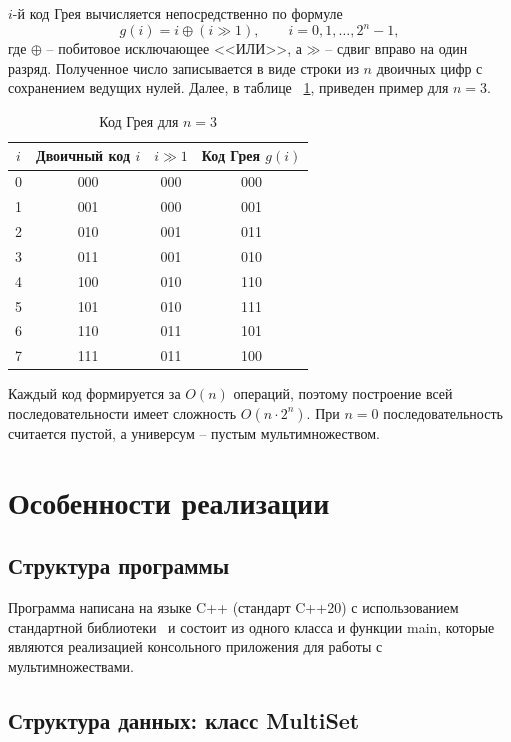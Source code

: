\documentclass[14pt,a4paper]{extreport}
\newcommand{\xor}{\mathbin{\oplus}}
\newcommand{\shr}{\mathbin{\gg}}
\begin{document}
$i$-й код Грея вычисляется непосредственно по формуле
\begin{equation}
g(i)=i\xor(i\shr 1),\qquad i=0,1,\ldots,2^n-1,
\end{equation}
где $\xor$ -- побитовое исключающее <<ИЛИ>>, а $\shr$ -- сдвиг вправо на один разряд. Полученное число записывается в виде строки из $n$ двоичных цифр с сохранением ведущих нулей. Далее, в таблице ~\ref{tab:gray}, приведен пример для $n=3$. 

\begin{table}[H]
\caption{Код Грея для $n=3$}\label{tab:gray}
\centering\small\singlespacing
\begin{tabular}{|c|c|c|c|}
\toprule
$i$ & Двоичный код $i$ & $i\shr 1$ & Код Грея $g(i)$ \\
\midrule
0 & 000 & 000 & 000 \\ \hline
1 & 001 & 000 & 001 \\ \hline
2 & 010 & 001 & 011 \\ \hline
3 & 011 & 001 & 010 \\ \hline
4 & 100 & 010 & 110 \\ \hline
5 & 101 & 010 & 111 \\ \hline
6 & 110 & 011 & 101 \\ \hline
7 & 111 & 011 & 100 \\
\bottomrule
\end{tabular}
\end{table}

Каждый код формируется за $O(n)$ операций, поэтому построение всей последовательности имеет сложность $O(n\cdot 2^n)$. При $n=0$ последовательность считается пустой, а универсум -- пустым мультимножеством.

{\centering\section{Особенности реализации}}

\subsection{Структура программы}

Программа написана на языке C++ (стандарт C++20) с использованием стандартной библиотеки~\cite{cppref} и состоит из одного класса и функции main, которые являются реализацией консольного приложения для работы с мультимножествами.

\subsection{Структура данных: класс MultiSet}
\end{document}
